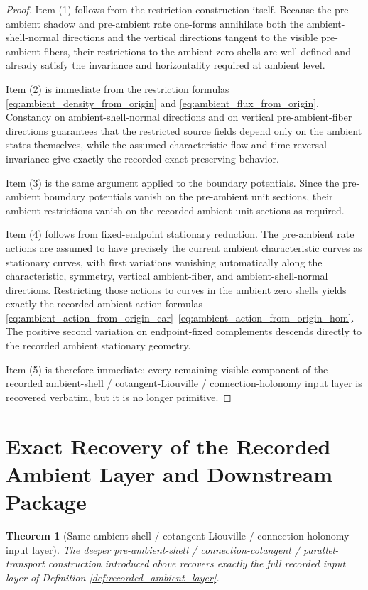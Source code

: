 \documentclass[11pt]{article}
\newtheorem{theorem}{Theorem}
\begin{document}
\begin{proof}
Item (1) follows from the restriction construction itself. Because the pre-ambient shadow and pre-ambient rate one-forms annihilate both the ambient-shell-normal directions and the vertical directions tangent to the visible pre-ambient fibers, their restrictions to the ambient zero shells are well defined and already satisfy the invariance and horizontality required at ambient level.

Item (2) is immediate from the restriction formulas \eqref{eq:ambient_density_from_origin} and \eqref{eq:ambient_flux_from_origin}. Constancy on ambient-shell-normal directions and on vertical pre-ambient-fiber directions guarantees that the restricted source fields depend only on the ambient states themselves, while the assumed characteristic-flow and time-reversal invariance give exactly the recorded exact-preserving behavior.

Item (3) is the same argument applied to the boundary potentials. Since the pre-ambient boundary potentials vanish on the pre-ambient unit sections, their ambient restrictions vanish on the recorded ambient unit sections as required.

Item (4) follows from fixed-endpoint stationary reduction. The pre-ambient rate actions are assumed to have precisely the current ambient characteristic curves as stationary curves, with first variations vanishing automatically along the characteristic, symmetry, vertical ambient-fiber, and ambient-shell-normal directions. Restricting those actions to curves in the ambient zero shells yields exactly the recorded ambient-action formulas \eqref{eq:ambient_action_from_origin_car}--\eqref{eq:ambient_action_from_origin_hom}. The positive second variation on endpoint-fixed complements descends directly to the recorded ambient stationary geometry.

Item (5) is therefore immediate: every remaining visible component of the recorded ambient-shell / cotangent-Liouville / connection-holonomy input layer is recovered verbatim, but it is no longer primitive.
\end{proof}

\section{Exact Recovery of the Recorded Ambient Layer and Downstream Package}

\begin{theorem}[Same ambient-shell / cotangent-Liouville / connection-holonomy input layer]
\label{thm:same_ambient_input}
The deeper pre-ambient-shell / connection-cotangent / parallel-transport construction introduced above recovers exactly the full recorded input layer of Definition \ref{def:recorded_ambient_layer}.
\end{theorem}
\end{document}
